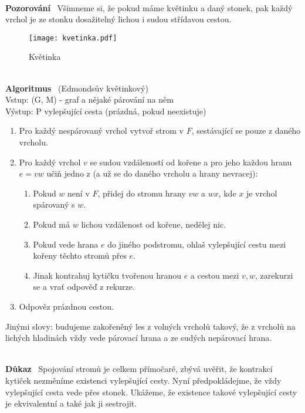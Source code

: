 \documentclass{article}
\renewcommand{\paragraph}[1]{\ \\\smallskip\noindent\textbf{#1}\ }
\begin{document}
\paragraph{Pozorování} Všimneme si, že pokud máme květinku a daný stonek, pak 
každý vrchol je ze stonku dosažitelný lichou i sudou střídavou cestou.

\begin{wrapfigure}{r}{0.2\textwidth}
\centering
\texttt{[image: kvetinka.pdf]}
\caption{Květinka}
\label{edmonds:kvetinka}
\end{wrapfigure}

\paragraph{Algoritmus} (Edmondsův květinkový)\\
\indent Vstup: (G, M) - graf a nějaké párování na něm \\
\indent Výstup: P vylepšující cesta (prázdná, pokud neexistuje)
\begin{enumerate}
	\item Pro každý nespárovaný vrchol vytvoř strom v $F$, sestávající se pouze 
	z daného vrcholu.
	\item Pro každý vrchol $v$ se sudou vzdáleností od kořene a pro jeho každou 
	hranu $e = vw$ učiň jedno z (a už se do daného vrcholu a hrany nevracej):
	\begin{enumerate}
		\item Pokud $w$ není v $F$, přidej do stromu hrany $vw$ a $wx$, kde $x$ 
		je vrchol spárovaný s $w$.
		\item Pokud má $w$ lichou vzdálenost od kořene, nedělej nic.
		\item Pokud vede hrana $e$ do jiného podstromu, ohlaš vylepšující cestu 
		mezi kořeny těchto stromů přes $e$.
		\item Jinak kontrahuj kytičku tvořenou hranou $e$ a cestou mezi $v,w$, 
		zarekurzi se a vrať odpověď z rekurze.
	\end{enumerate}
	\item Odpověz prázdnou cestou.
\end{enumerate}

Jinými slovy: budujeme zakořeněný les z volných vrcholů takový, že z vrcholů na 
lichých hladinách vždy vede párovací hrana a ze sudých nepárovací hrana.  

\paragraph{Důkaz}
Spojování stromů je celkem přímočaré, zbývá uvěřit, že kontrakcí kytiček 
nezměníme existenci vylepšující cesty. Nyní předpokládejme, že vždy vylepšující 
cesta vede přes stonek. Ukážeme, že existence takové vylepšující cesty je 
ekvivalentní a také jak ji sestrojit.
\end{document}
